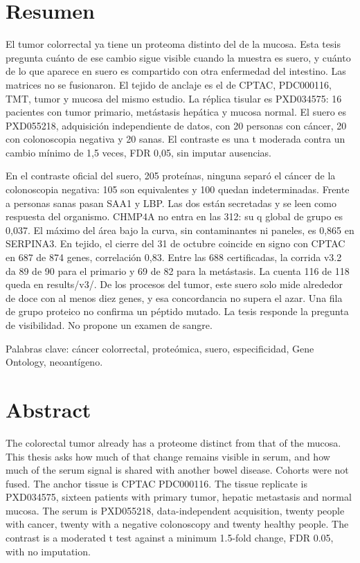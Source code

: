 \documentclass[12pt,oneside]{report}
\begin{document}
\chapter*{Resumen}
El tumor colorrectal ya tiene un proteoma distinto del de la mucosa. Esta tesis pregunta cuánto de ese cambio sigue visible cuando la muestra es suero, y cuánto de lo que aparece en suero es compartido con otra enfermedad del intestino. Las matrices no se fusionaron. El tejido de anclaje es el de CPTAC, PDC000116, TMT, tumor y mucosa del mismo estudio. La réplica tisular es PXD034575: 16 pacientes con tumor primario, metástasis hepática y mucosa normal. El suero es PXD055218, adquisición independiente de datos, con 20 personas con cáncer, 20 con colonoscopia negativa y 20 sanas. El contraste es una t moderada contra un cambio mínimo de 1,5 veces, FDR 0,05, sin imputar ausencias.

En el contraste oficial del suero, 205 proteínas, ninguna separó el cáncer de la colonoscopia negativa: 105 son equivalentes y 100 quedan indeterminadas. Frente a personas sanas pasan SAA1 y LBP. Las dos están secretadas y se leen como respuesta del organismo. CHMP4A no entra en las 312: su q global de grupo es 0,037. El máximo del área bajo la curva, sin contaminantes ni paneles, es 0,865 en SERPINA3. En tejido, el cierre del 31 de octubre coincide en signo con CPTAC en 687 de 874 genes, correlación 0,83. Entre las 688 certificadas, la corrida v3.2 da 89 de 90 para el primario y 69 de 82 para la metástasis. La cuenta 116 de 118 queda en results/v3/. De los procesos del tumor, este suero solo mide alrededor de doce con al menos diez genes, y esa concordancia no supera el azar. Una fila de grupo proteico no confirma un péptido mutado. La tesis responde la pregunta de visibilidad. No propone un examen de sangre.

Palabras clave: cáncer colorrectal, proteómica, suero, especificidad, Gene Ontology, neoantígeno.

\chapter*{Abstract}
The colorectal tumor already has a proteome distinct from that of the mucosa. This thesis asks how much of that change remains visible in serum, and how much of the serum signal is shared with another bowel disease. Cohorts were not fused. The anchor tissue is CPTAC PDC000116. The tissue replicate is PXD034575, sixteen patients with primary tumor, hepatic metastasis and normal mucosa. The serum is PXD055218, data-independent acquisition, twenty people with cancer, twenty with a negative colonoscopy and twenty healthy people. The contrast is a moderated t test against a minimum 1.5-fold change, FDR 0.05, with no imputation.
\end{document}

